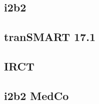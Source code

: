 



\subsection{i2b2}

\subsection{tranSMART 17.1}

\subsection{IRCT}

\subsection{i2b2 MedCo}




        
